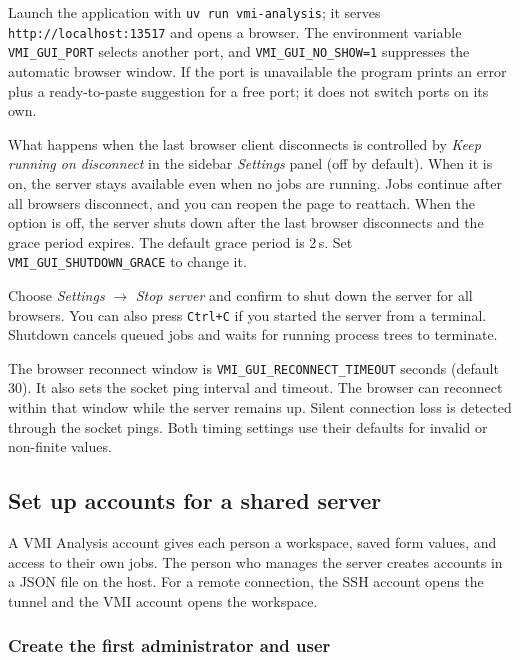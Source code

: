 \documentclass[11pt,a4paper]{article}
\newcommand{\code}[1]{\texttt{#1}}
\begin{document}
Launch the application with \code{uv run vmi-\allowbreak{}analysis}; it serves
\code{http:/\allowbreak{}/\allowbreak{}localhost:13517} and opens a browser. The environment variable
\code{VMI\_\allowbreak{}GUI\_\allowbreak{}PORT} selects another port, and
\code{VMI\_\allowbreak{}GUI\_\allowbreak{}NO\_\allowbreak{}SHOW=1} suppresses the automatic browser window. If the
port is unavailable the program prints an error plus a ready-to-paste
suggestion for a free port; it does not switch ports on its own.

What happens when the last browser client disconnects is controlled by
\emph{Keep running on disconnect} in the sidebar \emph{Settings} panel (off by
default). When it is on, the server stays available even when no jobs are
running. Jobs continue after all browsers disconnect, and you can reopen the
page to reattach. When the option is off, the server shuts down after the last
browser disconnects and the grace period expires. The default grace period is
2\,s. Set \code{VMI\_\allowbreak{}GUI\_\allowbreak{}SHUTDOWN\_\allowbreak{}GRACE} to change it.

Choose \emph{Settings} $\rightarrow$ \emph{Stop server} and confirm to shut
down the server for all browsers. You can also press \code{Ctrl+C} if you
started the server from a terminal. Shutdown cancels queued jobs and waits
for running process trees to terminate.

The browser reconnect window is \code{VMI\_\allowbreak{}GUI\_\allowbreak{}RECONNECT\_\allowbreak{}TIMEOUT}
seconds (default 30). It also sets the socket ping interval and timeout.
The browser can reconnect within that window while the server remains up.
Silent connection loss is detected through the socket pings. Both timing
settings use their defaults for invalid or non-finite values.

\subsection{Set up accounts for a shared server}
\label{sec:shared-accounts}

A VMI Analysis account gives each person a workspace, saved form
values, and access to their own jobs. The person who manages the server
creates accounts in a JSON file on the host. For a remote connection,
the SSH account opens the tunnel and the VMI account opens the workspace.

\subsubsection{Create the first administrator and user}
\end{document}
